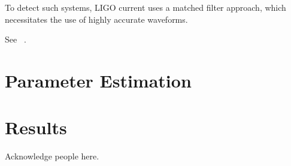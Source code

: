 \documentclass[nofootinbib,preprintnumbers,superscriptaddress,notitlepage]{revtex4-1}
\newcommand{\<}{\begin{equation}}
\newcommand{\?}{\end{equation}}
\begin{document}
To detect such systems, LIGO current uses a matched filter approach, which 
necessitates the use of highly accurate waveforms. 

See ~\cite{Lundgren2014}.

\section{Parameter Estimation}

\section{Results}


\acknowledgments

Acknowledge people here.


\end{document}
